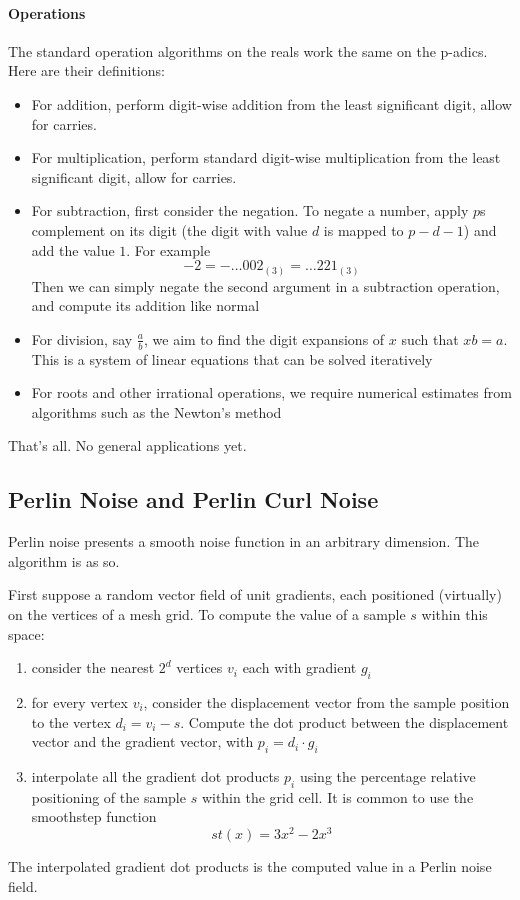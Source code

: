 \documentclass[11pt]{article}
\begin{document}
\paragraph{Operations}
The standard operation algorithms on the reals work the same on the p-adics. Here are their definitions:
\begin{itemize}
	\item For addition, perform digit-wise addition from the least significant digit, allow for carries.
	\item For multiplication, perform standard digit-wise multiplication from the least significant digit, allow for carries.
	\item For subtraction, first consider the negation. To negate a number, apply $p$s complement on its digit (the digit with value $d$ is mapped to $p-d-1$) and add the value $1$. For example
	\[
		-2 = -\dots002_{(3)} = \dots 221_{(3)}
	\]
	Then we can simply negate the second argument in a subtraction operation, and compute its addition like normal
	\item For division, say $\frac{a}{b}$, we aim to find the digit expansions of $x$ such that $x b = a$. This is a system of linear equations that can be solved iteratively
	\item For roots and other irrational operations, we require numerical estimates from algorithms such as the Newton's method
\end{itemize}

That's all. No general applications yet.

\newpage
\subsection{Perlin Noise and Perlin Curl Noise}
Perlin noise presents a smooth noise function in an arbitrary dimension. The algorithm is as so.

First suppose a random vector field of unit gradients, each positioned (virtually) on the vertices of a mesh grid. To compute the value of a sample $s$ within this space:
\begin{enumerate}
	\item consider the nearest $2^d$ vertices $v_i$ each with gradient $g_i$
	\item for every vertex $v_i$, consider the displacement vector from the sample position to the vertex $d_i = v_i - s$. Compute the dot product between the displacement vector and the gradient vector, with $p_i = d_i \cdot g_i$
	\item interpolate all the gradient dot products $p_i$ using the percentage relative positioning of the sample $s$ within the grid cell. It is common to use the smoothstep function
	\[
		st(x) = 3x^2 - 2x^3
	\]
\end{enumerate}
The interpolated gradient dot products is the computed value in a Perlin noise field.
\end{document}

